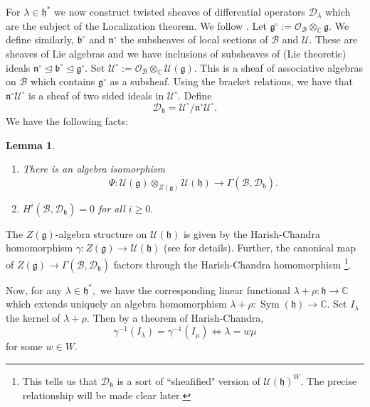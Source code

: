 \documentclass[letterpaper,twosided,11pt]{article}
\theoremstyle{plain}
\newtheorem{lemma}[theorem]{Lemma}
\theoremstyle{definition}
\theoremstyle{remark}
\newcommand{\C}{\mathbb{C}}
\newcommand{\script}[1]{\mathscr{#1}}
\newcommand{\tensor}{\otimes}
\newcommand{\lie}[1]{\mathfrak{#1}}
\begin{document}
For $ \lambda\in \lie{h}^* $ we now construct twisted sheaves of
differential operators $ \mathcal{D}_\lambda $ which are the subject of
the Localization theorem.  We follow
\cite[Section 3]{Milicic1993}.  Let $ \lie{g}^\circ:=\mathcal{O}_\mathcal
{B}\tensor_\C \lie{g}. $ We define similarly, $ \lie{b}^\circ $ and $
\lie{n}^\circ $ the subsheaves of local sections of $ \script{B} $ and $
\script{U}. $ These are sheaves of Lie algebras and we have inclusions
of subsheaves of (Lie theoretic) ideals $ \lie{n}^\circ \trianglelefteq
\lie{b}^\circ \trianglelefteq \lie{g}^\circ $.  Set $ \mathcal{U}^\circ:=\mathcal
{O}_\mathcal{B}\tensor_\C \mathcal{U}(\lie{g}). $ This is a sheaf of
associative algebras on $ \mathcal{B} $ which contains $ \lie{g}^\circ $
as a subsheaf.  Using the bracket relations, we have that $ \lie{n}^\circ\mathcal
{U}^\circ $ is a sheaf of two sided ideals in $ \mathcal{U}^\circ. $
Define
\[
    \mathcal{D}_\lie{h}=\mathcal{U}^\circ/\lie{n}^\circ \mathcal{U}^\circ.
\]
We have the following facts:

\begin{lemma}
    \cite{Milicic1993}
    \begin{enumerate}
        \item
            There is an algebra isomorphism
            \[
                \Psi:\mathcal{U}(\lie{g})\tensor_{Z(\lie{g})}\mathcal{U}
                (\lie{h})\to \Gamma(\mathcal{B},\mathcal{D}_\lie{h}).
            \]
        \item
            $ H^i(\mathcal{B},\mathcal{D}_\lie{h})=0 $ for all $ i\geq
            0. $
    \end{enumerate}
\end{lemma}

The $ Z(\lie{g}) $-algebra structure on $ \mathcal{U}(\lie{h}) $ is
given by the Harish-Chandra homomorphism $ \gamma:Z(\lie{g})\to \mathcal
{U}(\lie{h}) $ (see
\cite[Chapter 5]{Knapp2005} for details).  Further, the canonical map of
$ Z(\lie{g})\to \Gamma(\mathcal{B},\mathcal{D}_\lie{h}) $ factors
through the Harish-Chandra homomorphism%
\footnote{This tells us that $ \mathcal{D}_\lie{h} $ is a sort of
``sheafified" version of $ \mathcal{U}(\lie{h})^W. $ The precise
relationship will be made clear later.}.

Now, for any $ \lambda\in \lie{h}^*, $ we have the corresponding linear
functional $ \lambda+\rho:\lie{h}\to\C $ which extends uniquely an
algebra homomorphism $ \lambda+\rho:
\operatorname{Sym}
(\lie{h})\to \C. $ Set $ I_\lambda $ the kernel of $ \lambda+\rho. $
Then by a theorem of Harish-Chandra,
\[
    \gamma^{-1}(I_\lambda)=\gamma^{-1}(I_\mu) \iff \lambda=w\mu
\]
for some $ w\in W. $
\end{document}
